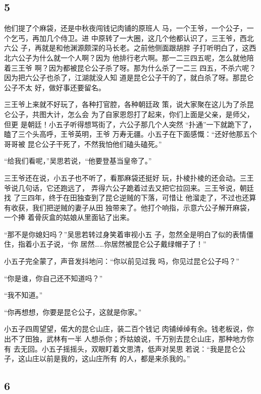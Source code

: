 {\centering\subsection{5}}

他们提了个麻袋，还是中秋夜闯钱记肉铺的原班人
马，一个王爷，一个公子，一个乞丐，再加几个侍卫。进
中原转了一大圈，这几个他都认识了，三王爷，西北六公
子，再就是和他渊源颇深的马长老。之前他侧面跟胡胖
子打听明白了，这西北六公子为什么就一个人啊？因为
他排行老六啊。那一二三四五呢，怎么就他陪着三王爷
啊？因为都被昆仑公子杀了呀。那为什么杀了一二三
四五，不杀六呢？因为把六公子也杀了，江湖就没人知
道是昆仑公子干的了，就白杀了呀。那昆仑公子不太
好，做好事还要留名。

三王爷上来就不好玩了，各种打官腔，各种朝廷政
策，说大家聚在这儿为了杀昆仑公子，共图大计，怎么会
为了自家恩怨打了起来，你们上面是父亲，是师父，但更
是朝廷！小五子听得想骂街了，六公子那几个人突然
“扑通”一下就跪下了，瞌了三个头高呼，王爷英明，王爷
万寿无疆。小五子在下面感慨：“还好他那五个哥哥被
昆仑公子干死了，不然我怕他们磕头磕死。”

“给我们看呢，”吴思若说，“他要登基当皇帝了。”

三王爷还在说，小五子也不听了，看那麻袋还挺好
玩，扑棱扑棱的还会动。三王爷说几句话，它还跑远了，
弄得六公子跪着过去又把它拉回来。三王爷说，朝廷找
了三四年，终于在田独查到了昆仑逆贼的下落，可惜让
他溜走了，不过也还算有收获，我们把逆贼的妻子从田
独带来了。他打个响指，示意六公子解开麻袋，一个捧
着骨灰盒的姑娘从里面钻了出来。

“那不是你媳妇吗？”吴思若转过身笑着审视小五
子，忽然全是明白了似的表情僵住，指着小五子说，“你
居然……你居然被昆仑公子戴绿帽子了！”

小五子完全蒙了，声音发抖地问：“你以前见过我
吗，你见过昆仑公子吗？”

“你是谁，你自己还不知道吗？”

“我不知道。”

“你再想想，你要是昆仑公子，这就是你家。”

小五子四周望望，偌大的昆仑山庄，装二百个钱记
肉铺绰绰有余。钱老板说，你出不了田独，武林有一半
人想杀你；乔姑娘说，千万别去昆仑山庄，那种地方你有
去无回。小五子摇摇头，双眼盯着文思清，低声对吴思
若说：“我是昆仑公子，这山庄以前是我的，这山庄所有
的人，都是来杀我的。”
\newline

{\centering\subsection{6}}

